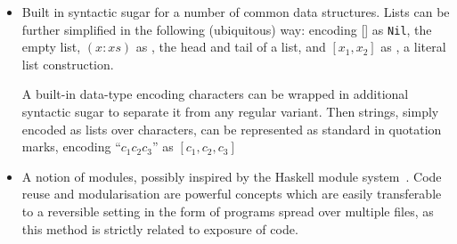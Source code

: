 \begin{itemize}

  \item Built in syntactic sugar for a number of common data structures. Lists
    can be further simplified in the following (ubiquitous) way: encoding [] as
    \texttt{Nil}, the empty list, $(x:xs)$ as , the head
    and tail of a list, and $[x_1, x_2]$ as ,
    a literal list construction.

    A built-in  data-type encoding characters can be wrapped in
    additional syntactic sugar to separate it from any regular variant. Then
    strings, simply encoded as lists over characters, can be represented as
    standard in quotation marks, encoding ``$c_1c_2c_3$'' as $[c_1, c_2, c_3]$

  \item A notion of modules, possibly inspired by the Haskell module
    system~\cite{Diatchki:2002}. Code reuse and modularisation are powerful
    concepts which are easily transferable to a reversible setting in the form
    of programs spread over multiple files, as this method is strictly related
    to exposure of code.

\end{itemize}
